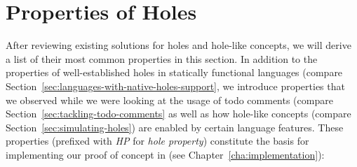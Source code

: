 \section{Properties of Holes}
\label{sec:relevant-properties}
After reviewing existing solutions for holes and hole-like concepts, we will derive a list of their most common properties in this section.
In addition to the properties of well-established holes in statically functional languages (compare Section~\ref{sec:languages-with-native-holes-support}, we introduce properties that we observed while we were looking at the usage of todo comments (compare Section~\ref{sec:tackling-todo-comments} as well as how hole-like concepts (compare Section~\ref{sec:simulating-holes}) are enabled by certain language features.
These properties (prefixed with \emph{HP} for \emph{hole property}) constitute the basis for implementing our proof of concept in \CS (see Chapter~\ref{cha:implementation}):
%
